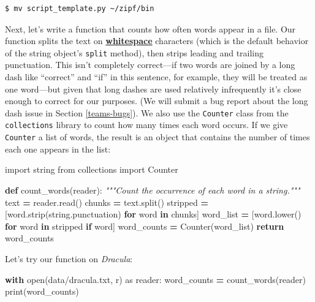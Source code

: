 \documentclass[
]{krantz}
\makeatletter
\newenvironment{Shaded}{\begin{snugshade}}{\end{snugshade}}
\newcommand{\BuiltInTok}[1]{#1}
\newcommand{\CommentTok}[1]{\textcolor[rgb]{0.56,0.35,0.01}{\textit{#1}}}
\newcommand{\ControlFlowTok}[1]{\textcolor[rgb]{0.13,0.29,0.53}{\textbf{#1}}}
\newcommand{\ImportTok}[1]{#1}
\newcommand{\KeywordTok}[1]{\textcolor[rgb]{0.13,0.29,0.53}{\textbf{#1}}}
\newcommand{\NormalTok}[1]{#1}
\newcommand{\OperatorTok}[1]{\textcolor[rgb]{0.81,0.36,0.00}{\textbf{#1}}}
\newcommand{\StringTok}[1]{\textcolor[rgb]{0.31,0.60,0.02}{#1}}
\newenvironment{kframe}{%
\medskip{}
\setlength{\fboxsep}{.8em}
 \def\at@end@of@kframe{}%
 \ifinner\ifhmode%
  \def\at@end@of@kframe{\end{minipage}}%
  \begin{minipage}{\columnwidth}%
 \fi\fi%
 \def\FrameCommand##1{\hskip\@totalleftmargin \hskip-\fboxsep
 \colorbox{shadecolor}{##1}\hskip-\fboxsep
     \hskip-\linewidth \hskip-\@totalleftmargin \hskip\columnwidth}%
 \MakeFramed {\advance\hsize-\width
   \@totalleftmargin\z@ \linewidth\hsize
   \@setminipage}}%
 {\par\unskip\endMakeFramed%
 \at@end@of@kframe}
\renewenvironment{Shaded}{\begin{kframe}}{\end{kframe}}
\newcommand{\gref}[2]{\hyperlink{#2}{\textbf{#1}}}
\makeatother
\begin{document}
\begin{verbatim}
$ mv script_template.py ~/zipf/bin
\end{verbatim}

Next,
let's write a function that counts how often words appear in a file.
Our function splits the text on \gref{whitespace}{whitespace} characters
(which is the default behavior of the string object's \texttt{split} method),
then strips leading and trailing punctuation.
This isn't completely correct---if two words are joined by a long dash
like ``correct'' and ``if'' in this sentence, for example,
they will be treated as one word---but given that long dashes are used relatively
infrequently it's close enough to correct for our purposes.
(We will submit a bug report about the long dash issue in Section \ref{teams-bugs}).
We also use the \texttt{Counter} class from the \texttt{collections} library
to count how many times each word occurs.
If we give \texttt{Counter} a list of words,
the result is an object that contains
the number of times each one appears in the list:

\begin{Shaded}
\begin{Highlighting}[]
\ImportTok{import}\NormalTok{ string}
\ImportTok{from}\NormalTok{ collections }\ImportTok{import}\NormalTok{ Counter}


\KeywordTok{def}\NormalTok{ count\_words(reader):}
    \CommentTok{"""Count the occurrence of each word in a string."""}
\NormalTok{    text }\OperatorTok{=}\NormalTok{ reader.read()}
\NormalTok{    chunks }\OperatorTok{=}\NormalTok{ text.split()}
\NormalTok{    stripped }\OperatorTok{=}\NormalTok{ [word.strip(string.punctuation) }\ControlFlowTok{for}\NormalTok{ word }\KeywordTok{in}\NormalTok{ chunks]}
\NormalTok{    word\_list }\OperatorTok{=}\NormalTok{ [word.lower() }\ControlFlowTok{for}\NormalTok{ word }\KeywordTok{in}\NormalTok{ stripped }\ControlFlowTok{if}\NormalTok{ word]}
\NormalTok{    word\_counts }\OperatorTok{=}\NormalTok{ Counter(word\_list)}
    \ControlFlowTok{return}\NormalTok{ word\_counts}
\end{Highlighting}
\end{Shaded}

Let's try our function on \emph{Dracula}:

\begin{Shaded}
\begin{Highlighting}[]
\ControlFlowTok{with} \BuiltInTok{open}\NormalTok{(}\StringTok{\textquotesingle{}data/dracula.txt\textquotesingle{}}\NormalTok{, }\StringTok{\textquotesingle{}r\textquotesingle{}}\NormalTok{) }\ImportTok{as}\NormalTok{ reader:}
\NormalTok{    word\_counts }\OperatorTok{=}\NormalTok{ count\_words(reader)}
\BuiltInTok{print}\NormalTok{(word\_counts)}
\end{Highlighting}
\end{Shaded}
\end{document}
